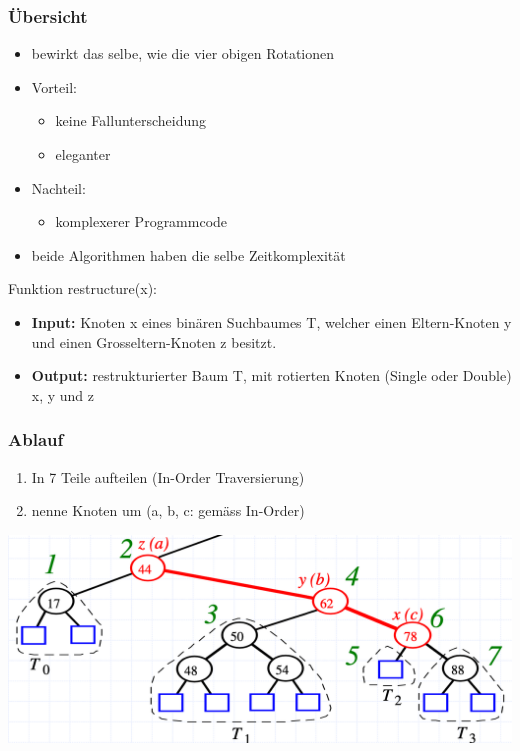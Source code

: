 \subsubsection{Übersicht}
\begin{itemize}
    \item bewirkt das selbe, wie die vier obigen Rotationen
    \item Vorteil:
    \begin{itemize}
        \item keine Fallunterscheidung
        \item eleganter
    \end{itemize}
    \item Nachteil:
    \begin{itemize}
        \item komplexerer Programmcode
    \end{itemize}
    \item beide Algorithmen haben die selbe Zeitkomplexität
\end{itemize}

Funktion restructure(x):
\begin{itemize}
    \item \textbf{Input:} Knoten x eines binären Suchbaumes T, welcher einen Eltern-Knoten y und einen Grosseltern-Knoten z besitzt.
    \item \textbf{Output:} restrukturierter Baum T, mit rotierten Knoten (Single oder Double) x, y und z
\end{itemize}

\subsubsection{Ablauf}
\begin{enumerate}
    \item In 7 Teile aufteilen (In-Order Traversierung)
    \item nenne Knoten um (a, b, c: gemäss In-Order)
\end{enumerate}
\vspace{-8pt}
\begin{center}
    \includegraphics[scale=.28]{graphic/02 AVLTrees/Cut-Link1.png}
\end{center}
\vspace{-8pt}

